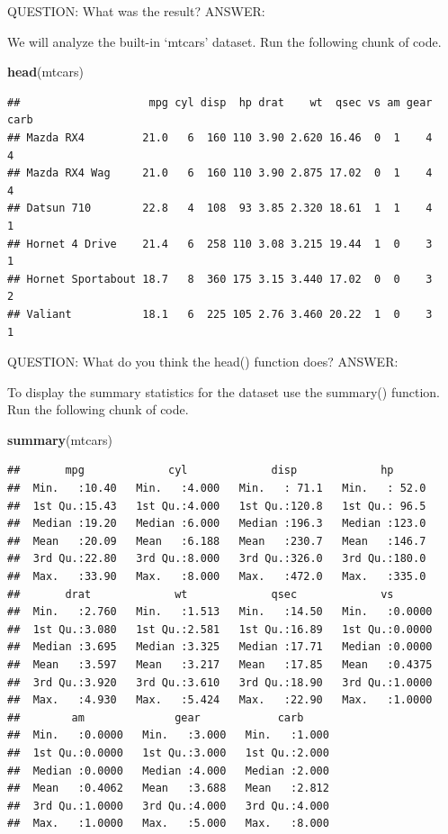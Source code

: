\documentclass[
]{article}
\newenvironment{Shaded}{\begin{snugshade}}{\end{snugshade}}
\newcommand{\FunctionTok}[1]{\textcolor[rgb]{0.13,0.29,0.53}{\textbf{#1}}}
\newcommand{\NormalTok}[1]{#1}
\begin{document}
QUESTION: What was the result? ANSWER:

We will analyze the built-in `mtcars' dataset. Run the following chunk
of code.

\begin{Shaded}
\begin{Highlighting}[]
\FunctionTok{head}\NormalTok{(mtcars)}
\end{Highlighting}
\end{Shaded}

\begin{verbatim}
##                    mpg cyl disp  hp drat    wt  qsec vs am gear carb
## Mazda RX4         21.0   6  160 110 3.90 2.620 16.46  0  1    4    4
## Mazda RX4 Wag     21.0   6  160 110 3.90 2.875 17.02  0  1    4    4
## Datsun 710        22.8   4  108  93 3.85 2.320 18.61  1  1    4    1
## Hornet 4 Drive    21.4   6  258 110 3.08 3.215 19.44  1  0    3    1
## Hornet Sportabout 18.7   8  360 175 3.15 3.440 17.02  0  0    3    2
## Valiant           18.1   6  225 105 2.76 3.460 20.22  1  0    3    1
\end{verbatim}

QUESTION: What do you think the head() function does? ANSWER:

To display the summary statistics for the dataset use the summary()
function. Run the following chunk of code.

\begin{Shaded}
\begin{Highlighting}[]
\FunctionTok{summary}\NormalTok{(mtcars)}
\end{Highlighting}
\end{Shaded}

\begin{verbatim}
##       mpg             cyl             disp             hp       
##  Min.   :10.40   Min.   :4.000   Min.   : 71.1   Min.   : 52.0  
##  1st Qu.:15.43   1st Qu.:4.000   1st Qu.:120.8   1st Qu.: 96.5  
##  Median :19.20   Median :6.000   Median :196.3   Median :123.0  
##  Mean   :20.09   Mean   :6.188   Mean   :230.7   Mean   :146.7  
##  3rd Qu.:22.80   3rd Qu.:8.000   3rd Qu.:326.0   3rd Qu.:180.0  
##  Max.   :33.90   Max.   :8.000   Max.   :472.0   Max.   :335.0  
##       drat             wt             qsec             vs        
##  Min.   :2.760   Min.   :1.513   Min.   :14.50   Min.   :0.0000  
##  1st Qu.:3.080   1st Qu.:2.581   1st Qu.:16.89   1st Qu.:0.0000  
##  Median :3.695   Median :3.325   Median :17.71   Median :0.0000  
##  Mean   :3.597   Mean   :3.217   Mean   :17.85   Mean   :0.4375  
##  3rd Qu.:3.920   3rd Qu.:3.610   3rd Qu.:18.90   3rd Qu.:1.0000  
##  Max.   :4.930   Max.   :5.424   Max.   :22.90   Max.   :1.0000  
##        am              gear            carb      
##  Min.   :0.0000   Min.   :3.000   Min.   :1.000  
##  1st Qu.:0.0000   1st Qu.:3.000   1st Qu.:2.000  
##  Median :0.0000   Median :4.000   Median :2.000  
##  Mean   :0.4062   Mean   :3.688   Mean   :2.812  
##  3rd Qu.:1.0000   3rd Qu.:4.000   3rd Qu.:4.000  
##  Max.   :1.0000   Max.   :5.000   Max.   :8.000
\end{verbatim}
\end{document}
